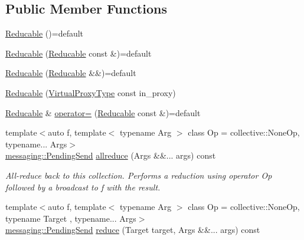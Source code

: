 \subsection*{Public Member Functions}
\begin{DoxyCompactItemize}
\item 
\hyperlink{structvt_1_1vrt_1_1collection_1_1_reducable_a807b462380873448bfcf4661b4b28a2d}{Reducable} ()=default
\item 
\hyperlink{structvt_1_1vrt_1_1collection_1_1_reducable_aafc682961c7c961547d91358cda46792}{Reducable} (\hyperlink{structvt_1_1vrt_1_1collection_1_1_reducable}{Reducable} const \&)=default
\item 
\hyperlink{structvt_1_1vrt_1_1collection_1_1_reducable_a4c5250ba5364ae0965c119773e87f4e8}{Reducable} (\hyperlink{structvt_1_1vrt_1_1collection_1_1_reducable}{Reducable} \&\&)=default
\item 
\hyperlink{structvt_1_1vrt_1_1collection_1_1_reducable_a658b587cdafda69c95ad0a2efe7a73fe}{Reducable} (\hyperlink{namespacevt_a1b417dd5d684f045bb58a0ede70045ac}{Virtual\+Proxy\+Type} const in\+\_\+proxy)
\item 
\hyperlink{structvt_1_1vrt_1_1collection_1_1_reducable}{Reducable} \& \hyperlink{structvt_1_1vrt_1_1collection_1_1_reducable_a7df8661d0e353935f034c4c0174c0872}{operator=} (\hyperlink{structvt_1_1vrt_1_1collection_1_1_reducable}{Reducable} const \&)=default
\item 
{\footnotesize template$<$auto f, template$<$ typename Arg $>$ class Op = collective\+::\+None\+Op, typename... Args$>$ }\\\hyperlink{structvt_1_1messaging_1_1_pending_send}{messaging\+::\+Pending\+Send} \hyperlink{structvt_1_1vrt_1_1collection_1_1_reducable_ad142a161c01dd963164d767233ec417d}{allreduce} (Args \&\&... args) const
\begin{DoxyCompactList}\small\item\em All-\/reduce back to this collection. Performs a reduction using operator {\ttfamily Op} followed by a broadcast to {\ttfamily f} with the result. \end{DoxyCompactList}\item 
{\footnotesize template$<$auto f, template$<$ typename Arg $>$ class Op = collective\+::\+None\+Op, typename Target , typename... Args$>$ }\\\hyperlink{structvt_1_1messaging_1_1_pending_send}{messaging\+::\+Pending\+Send} \hyperlink{structvt_1_1vrt_1_1collection_1_1_reducable_a7c4d42fbe284fa51533ae43e2a5759b1}{reduce} (Target target, Args \&\&... args) const

\end{DoxyCompactItemize}
